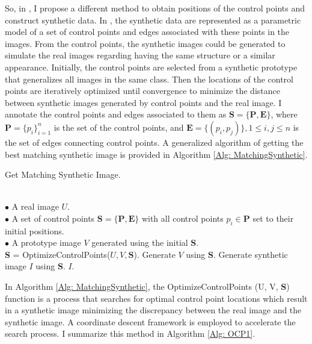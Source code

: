 \documentclass{iitthesis}
\begin{document}
So, in \cite{Zhang2014Autoencoder}, I propose a different method to obtain positions of the control points and construct synthetic data. In \cite{Zhang2014Autoencoder}, the synthetic data are represented as a parametric model of a set of control points and edges associated with these points in the images. From the control points, the synthetic
images could be generated to simulate the real images regarding having the same structure or a similar appearance. Initially, the control points are selected from a synthetic prototype that generalizes all images in the same class. Then the locations of the control points are iteratively optimized until convergence to minimize the distance between synthetic images generated by control points and the real image. I annotate the control points and edges associated to them as $\textbf{S}=\{\textbf{P},\textbf{E}\}$, where $\textbf{P}=\{p_{i}\}_{i=1}^{n}$ is the set of the control points, and $\textbf{E}=\{(p_{i},p_{j})\},1\leq i,j\leq n$ is the set of edges connecting control points. A generalized algorithm of getting the best matching synthetic image is provided in Algorithm \ref{Alg: MatchingSynthetic}.

{\linespread{1.5}
\begin{algorithm}[htb]  
\small
     \caption{ Get Matching Synthetic Image.}   
    \label{Alg: MatchingSynthetic}        
\begin{algorithmic}[1]      \REQUIRE ~~\\         
$\bullet$ A real image $U$. \\     
    $\bullet$ A set of control points 
$\textbf{S}=\{\textbf{P}, \textbf{E}\}$ 
with all control points $p_i\in \textbf{P}$ set to their initial positions.\\     
    $\bullet$ A prototype image $V$ generated using the initial $\textbf{S}$.  \\     
        \STATE \textbf{S} = OptimizeControlPoints($U, V, \textbf{S}$).         
    \STATE Generate $V$ using $\textbf{S}$.         
\ENDWHILE 
        \STATE Generate synthetic image $I$ using \textbf{S}.     
    \RETURN $I$.     
\end{algorithmic} 
 \end{algorithm}  
}

In Algorithm \ref{Alg: MatchingSynthetic}, the OptimizeControlPoints (U, V, \textbf{S}) function is a process that searches for optimal control point locations which result in a synthetic image minimizing the discrepancy between the real image and the synthetic image. A coordinate descent framework is employed to accelerate the search process. I summarize this method in Algorithm \ref{Alg: OCP1}.
\end{document}
